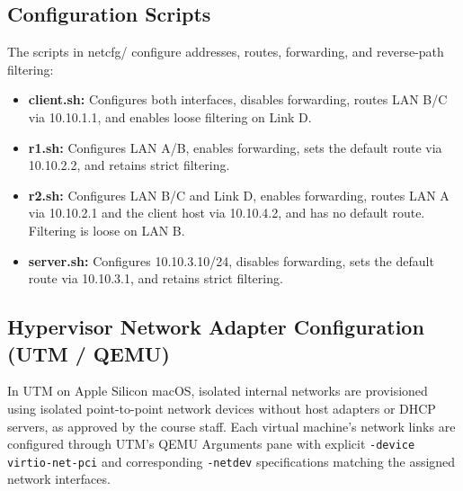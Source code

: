 \documentclass[12pt]{article}
\begin{document}
\subsection{Configuration Scripts}
The scripts in {netcfg/} configure addresses, routes, forwarding, and reverse-path filtering:

\begin{itemize}
    \item \textbf{client.sh:} Configures both interfaces, disables forwarding, routes LAN B/C via 10.10.1.1, and enables loose filtering on Link D.

    \item \textbf{r1.sh:} Configures LAN A/B, enables forwarding, sets the default route via 10.10.2.2, and retains strict filtering.

    \item \textbf{r2.sh:} Configures LAN B/C and Link D, enables forwarding, routes LAN A via 10.10.2.1 and the client host via 10.10.4.2, and has no default route. Filtering is loose on LAN B.

    \item \textbf{server.sh:} Configures 10.10.3.10/24, disables forwarding, sets the default route via 10.10.3.1, and retains strict filtering.
\end{itemize}

\subsection{Hypervisor Network Adapter Configuration (UTM / QEMU)}

In UTM on Apple Silicon macOS, isolated internal networks are provisioned using isolated point-to-point network devices without host adapters or DHCP servers, as approved by the course staff. Each virtual machine's network links are configured through UTM's QEMU Arguments pane with explicit \texttt{-device virtio-net-pci} and corresponding \texttt{-netdev} specifications matching the assigned network interfaces.
\end{document}
